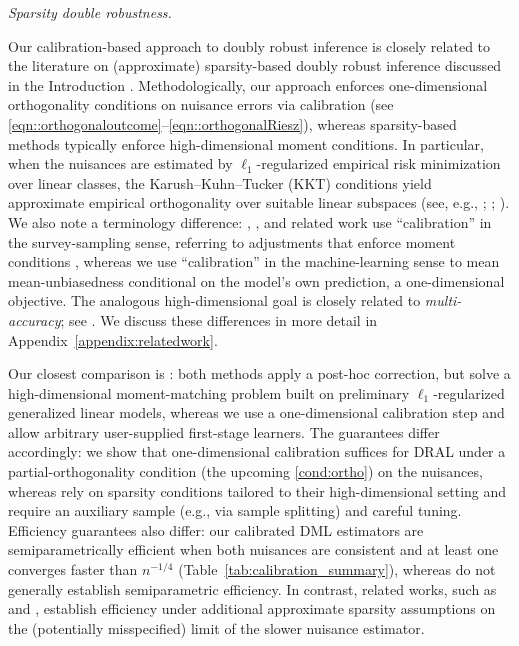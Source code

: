 \documentclass[11pt]{article}
\theoremstyle{plain}
\begin{document}
 \medskip\noindent \emph{Sparsity double robustness.} {\color{purple}
Our calibration-based approach to doubly robust inference is closely related to
the literature on (approximate) sparsity-based doubly robust inference
discussed in the Introduction \citep{athey2018approximate, bradic2019minimax,
smucler2019unifying, tan2020model, liu2023root}. Methodologically, our approach
enforces one-dimensional orthogonality conditions on nuisance errors via
calibration (see \eqref{eqn::orthogonaloutcome}--\eqref{eqn::orthogonalRiesz}),
whereas sparsity-based methods typically enforce high-dimensional moment
conditions. In particular, when the nuisances are estimated by
\(\ell_1\)-regularized empirical risk minimization over linear classes, the
Karush--Kuhn--Tucker (KKT) conditions yield approximate empirical orthogonality
over suitable linear subspaces (see, e.g., \citealp[Eq.~15]{tan2020model};
\citealp[Sec.~2.1]{bradic2019sparsity}; \citealp[Sec.~4.1]{smucler2019unifying}).
We also note a terminology difference: \cite{tan2020model}, \cite{liu2023root},
and related work use ``calibration'' in the survey-sampling sense, referring to
adjustments that enforce moment conditions \citep{deville1992calibration},
whereas we use ``calibration'' in the machine-learning sense to mean
mean-unbiasedness conditional on the model's own prediction, a one-dimensional
objective. The analogous high-dimensional goal is closely related to
\emph{multi-accuracy}; see \citealp{roth2022uncertain}. We discuss these
differences in more detail in Appendix~\ref{appendix:relatedwork}.


Our closest comparison is \cite{liu2023root}: both methods apply a post-hoc
correction, but \cite{liu2023root} solve a high-dimensional moment-matching
problem built on preliminary \(\ell_1\)-regularized generalized linear models,
whereas we use a one-dimensional calibration step and allow arbitrary
user-supplied first-stage learners. The guarantees differ accordingly: we show
that one-dimensional calibration suffices for DRAL under a
partial-orthogonality condition (the upcoming \ref{cond:ortho}) on the nuisances, whereas \cite{liu2023root}
rely on sparsity conditions tailored to their high-dimensional setting and
require an auxiliary sample (e.g., via sample splitting) and careful tuning.
Efficiency guarantees also differ: our calibrated DML estimators are
semiparametrically efficient when both nuisances are consistent and at least
one converges faster than \(n^{-1/4}\) (Table~\ref{tab:calibration_summary}),
whereas \cite{liu2023root} do not generally establish semiparametric
efficiency. In contrast, related works, such as \cite{bradic2019minimax} and \cite{smucler2019unifying}, establish
efficiency under additional approximate sparsity assumptions on the (potentially
misspecified) limit of the slower nuisance estimator.
}
\end{document}

